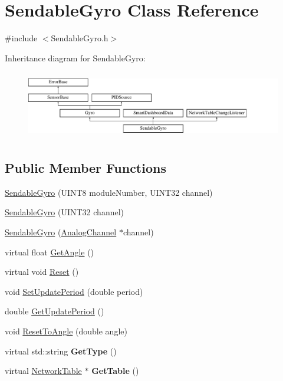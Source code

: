 \hypertarget{classSendableGyro}{
\section{SendableGyro Class Reference}
\label{classSendableGyro}
}


{\ttfamily \#include $<$SendableGyro.h$>$}

Inheritance diagram for SendableGyro:\begin{figure}[H]
\begin{center}
\leavevmode
\includegraphics[height=3.010753cm]{classSendableGyro}
\end{center}
\end{figure}
\subsection*{Public Member Functions}
\begin{DoxyCompactItemize}
\item 
\hyperlink{classSendableGyro_a317b683f65844d1eedaf9aab1c02af39}{SendableGyro} (UINT8 moduleNumber, UINT32 channel)
\item 
\hyperlink{classSendableGyro_a1489cd920da51fac531eba8619482603}{SendableGyro} (UINT32 channel)
\item 
\hyperlink{classSendableGyro_ae75ba3153bda30c839294a0e8b9df104}{SendableGyro} (\hyperlink{classAnalogChannel}{AnalogChannel} $\ast$channel)
\item 
virtual float \hyperlink{classSendableGyro_a1e192b880ff0590e431ca933b6ca0dc9}{GetAngle} ()
\item 
virtual void \hyperlink{classSendableGyro_acd4b377b5b5d71613f2209715ab29093}{Reset} ()
\item 
void \hyperlink{classSendableGyro_a6f9dfe13cc48629141b32676f1aa54e6}{SetUpdatePeriod} (double period)
\item 
double \hyperlink{classSendableGyro_a7117fec26909a23d25cb734e528beca8}{GetUpdatePeriod} ()
\item 
void \hyperlink{classSendableGyro_a028d543e7c2b8f75a4411d37b0cb89d1}{ResetToAngle} (double angle)
\item 
\hypertarget{classSendableGyro_aa781e34f50eb2710ced6a7b6d733fd1e}{
virtual std::string {\bfseries GetType} ()}
\label{classSendableGyro_aa781e34f50eb2710ced6a7b6d733fd1e}

\item 
\hypertarget{classSendableGyro_a32e99fd9df135da8aa7132ad5cdf89ca}{
virtual \hyperlink{classNetworkTable}{NetworkTable} $\ast$ {\bfseries GetTable} ()}
\label{classSendableGyro_a32e99fd9df135da8aa7132ad5cdf89ca}

\end{DoxyCompactItemize}


